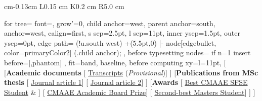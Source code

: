 \documentclass[10pt, letterpaper]{sulmancv}
\begin{document}
\begin{tabularx}{
             cm-0.13cm
        }{
            L{0.15 cm}
            K{0.2 cm}
            R{5.0 cm}
        }
            \begin{forest}
              for tree={
                font=\footnotesize,        %
                grow'=0,
                child anchor=west,
                parent anchor=south,
                anchor=west,
                calign=first,
                s sep=2.5pt,               %
                l sep=11pt,                %
                inner ysep=1.5pt, outer ysep=0pt, %
                edge path={
                  \noexpand\path[draw=primaryColor2,\forestoption{edge}]
                    (!u.south west) +(5.5pt,0)
                    |- node[edgebullet, color=primaryColor2] {}         %
                    (.child anchor);
                },
                before typesetting nodes={
                  if n=1 {insert before={[,phantom]}} {}
                },
                fit=band,
                baseline,                  %
                before computing xy={l=11pt},
              }
                [\textcolor{primaryColor}{\faFolderOpen[regular]}
                [\textbf{Academic documents}
                  [\textcolor{primaryColor}{\faFilePdf} \hspace{0.2cm}\href{\detokenize{https://sulmanolieko.github.io/authors/admin/Olieko.pdf}}{Transcripts} (\textit{Provisional})]
                ]
                [\textbf{Publications from MSc thesis}
                  [\textcolor{primaryColor}{\faFilePdf[regular]} \hspace{0.2cm}\scriptsize\href{\detokenize{https://doi.org/10.1080/09670874.2024.2413592}}{Journal article 1}]
                  [\textcolor{primaryColor}{\faFilePdf[regular]} \hspace{0.2cm}\scriptsize\href{\detokenize{https://sulmanolieko.github.io/publication/wp/heterogeneous_efficiency__.pdf}}{Journal article 2}]
                ]
                [\textbf{Awards}
                  [\textcolor{primaryColor}{\faMedal} \quad \scriptsize\href{https://aercafrica.org/aerc-insights/african-economies-recovery-agenda-from-multiple-shocks/\#dflip-df\_17933/32/}{Best CMAAE SFSE Student} \& \href{https://aercafrica.org/aerc-insights/youth-demographic-dividend-migration-and-economic-opportunities-in-african-economies/\#dflip-df\_18350/56/}{ }]
                  [\textcolor{primaryColor}{\faMedal} \quad\scriptsize\href{\detokenize{https://sulmanolieko.github.io/authors/admin/Best Student Certificate - CMAAE SFSE 2022 Academic Board Prize_.pdf}}{CMAAE Academic Board Prize}]
                  [\textcolor{primaryColor}{\faMedal} \quad \scriptsize\href{\detokenize{https://www.uonbi.ac.ke/news/student-recognition-awards-booklet}}{Second-best Masters Student}]
                ]
                ]
            \end{forest}
            

\end{tabularx}
\end{document}
